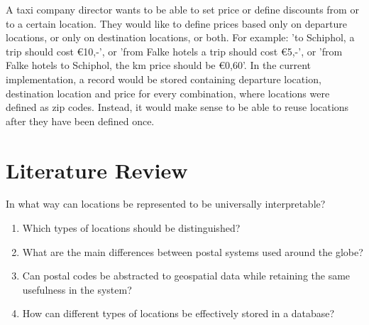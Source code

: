 A taxi company director wants to be able to set price or define discounts from or to a certain location. They would like to define prices based only on departure locations, or only on destination locations, or both. For example: 'to Schiphol, a trip should cost \euro 10,-', or 'from Falke hotels a trip should cost \euro 5,-', or 'from Falke hotels to Schiphol, the km price should be \euro 0,60'. In the current implementation, a record would be stored containing departure location, destination location and price for every combination, where locations were defined as zip codes. Instead, it would make sense to be able to reuse locations after they have been defined once.

\section{Literature Review}



In what way can locations be represented to be universally interpretable?
\begin{enumerate}
  \item Which types of locations should be distinguished?
  \item What are the main differences between postal systems used around the globe?
  \item Can postal codes be abstracted to geospatial data while retaining the same usefulness in the system?
  \item How can different types of locations be effectively stored in a database?
\end{enumerate}

